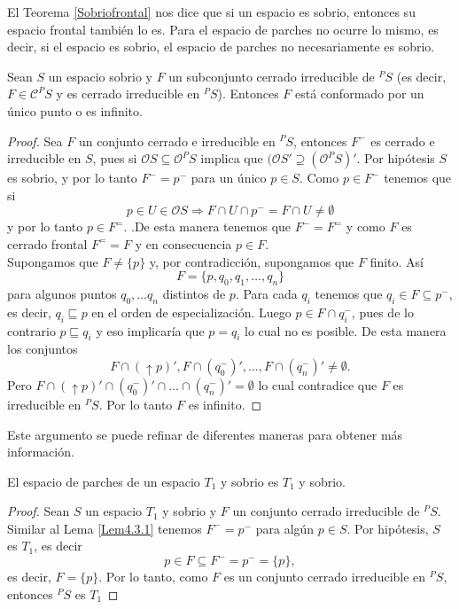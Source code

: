 El Teorema \ref{Sobriofrontal} nos dice que si un espacio es sobrio, entonces su espacio frontal también lo es. Para el espacio de parches no ocurre lo mismo, es decir, si el espacio es sobrio, el espacio de parches no necesariamente es sobrio.

\begin{lem}\label{Lem4.3.1}
    Sean $S$ un espacio sobrio y $F$ un subconjunto cerrado irreducible de $^PS$ (es decir, $F\in \mathcal{C}^PS$ y es cerrado irreducible en  $^PS$). Entonces $F$ está conformado por un único punto o es infinito.
\end{lem}

\begin{proof}
    Sea $F$ un conjunto cerrado e irreducible en $^PS$, entonces $F^-$ es cerrado e irreducible en $S$, pues si $\mathcal{O}S\subseteq \mathcal{O}^PS$ implica que $(\mathcal{O}S'\supseteq (\mathcal{O}^PS)'$. Por hipótesis $S$ es sobrio, y por lo tanto $F^-=p^-$ para un único $p\in S$. Como $p\in F^-$ tenemos que si 
    \[
    p\in U\in \mathcal{O}S\Rightarrow F\cap U\cap p^-=F\cap U\neq \emptyset
    \]
    y por lo tanto $p\in F^=$. .De esta manera tenemos que $F^-=F^=$ y como $F$ es cerrado frontal $F^= =F$ y en consecuencia $p\in F$.\\

    Supongamos que $F\neq \{p\}$ y, por contradicción, supongamos que $F$ finito. Así 
    \[
    F=\{p, q_0, q_1, \dots , q_n\}
    \] 
    para algunos puntos $q_0, \dots q_n$ distintos de $p$. Para cada $q_i$ tenemos que $q_i\in F\subseteq p^-$, es decir, $q_i\sqsubseteq p$ en el orden de especialización. Luego $p\in F\cap q_i^-$, pues de lo contrario $p\sqsubseteq q_i$ y eso implicaría que $p=q_i$ lo cual no es posible. De esta manera los conjuntos 
    \[
    F\cap (\uparrow p)', F\cap (q_0^-)', \dots , F\cap (q_n^-)'\neq \emptyset.
    \]
    Pero $F\cap (\uparrow p)'\cap (q_0^-)'\cap \dots \cap (q_n^-)'= \emptyset$ lo cual contradice que $F$ es irreducible en $^PS$. Por lo tanto $F$ es infinito.
\end{proof}

Este argumento se puede refinar de diferentes maneras para obtener más información.

\begin{lem}\label{Lem4.3.2}
    El espacio de parches de un espacio $T_1$ y sobrio es $T_1$ y sobrio.
\end{lem}

\begin{proof}
    Sean $S$ un espacio $T_1$ y sobrio y $F$ un conjunto cerrado irreducible de $^PS$. Similar al Lema \ref{Lem4.3.1} tenemos $F^-=p^-$ para algún $p\in S$. Por hipótesis, $S$ es $T_1$, es decir
    \[
    p\in F\subseteq F^-=p^-=\{p\},
    \]
    es decir, $F=\{p\}$. Por lo tanto, como $F$ es un conjunto cerrado irreducible en $^PS$, entonces $^PS$ es $T_1$
\end{proof}

